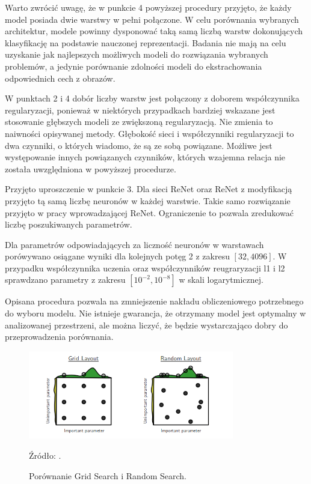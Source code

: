 \documentclass[oneside, mag]{mgr}
\begin{document}
Warto zwrócić uwagę, że w punkcie 4 powyższej procedury przyjęto, że każdy model posiada dwie warstwy w pełni połączone. W celu porównania wybranych architektur, modele powinny dysponować taką samą liczbą warstw dokonujących klasyfikację na podstawie nauczonej reprezentacji. Badania nie mają na celu uzyskanie jak najlepszych możliwych modeli do rozwiązania wybranych problemów, a jedynie porównanie zdolności modeli do ekstrachowania odpowiednich cech z obrazów.

W punktach 2 i 4 dobór liczby warstw jest połączony z doborem współczynnika regularyzacji, ponieważ w niektórych przypadkach bardziej wskazane jest stosowanie głębszych modeli ze zwiększoną regularyzacją. Nie zmienia to naiwności opisywanej metody. Głębokość sieci i współczynniki regularyzacji to dwa czynniki, o których wiadomo, że są ze sobą powiązane. Możliwe jest występowanie innych powiązanych czynników, których wzajemna relacja nie została uwzględniona w powyższej procedurze. 

Przyjęto uproszczenie w punkcie 3. Dla sieci ReNet oraz ReNet z modyfikacją przyjęto tą samą liczbę neuronów w każdej warstwie. Takie samo rozwiązanie przyjęto w pracy wprowadzającej ReNet. Ograniczenie to pozwala zredukować liczbę poszukiwanych parametrów.

Dla parametrów odpowiadających za liczność neuronów w warstawach porówywano osiągane wyniki dla kolejnych potęg 2 z zakresu $[32, 4096]$. W przypadku współczynnika uczenia oraz współczynników reugraryzacji l1 i l2 sprawdzano parametry z zakresu $[10^{-2}, 10^{-8}]$ w skali logarytmicznej.

Opisana procedura pozwala na zmniejszenie nakładu obliczeniowego potrzebnego do wyboru modelu. Nie istnieje gwarancja, że otrzymany model jest optymalny w analizowanej przestrzeni, ale można liczyć, że będzie wystarczająco dobry do przeprowadzenia porównania.

\begin{figure}
\centering
	\includegraphics[width=0.8\textwidth]{img/grid_search.png}
	\caption{Porównanie Grid Search i Random Search.} Źródło: \cite{Bergstra:2012:RSH:2503308.2188395}.
	\label{fig:hyperparams}
\end{figure}
\end{document}
